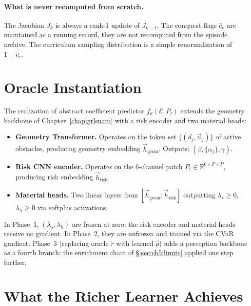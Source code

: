 \paragraph{What is never recomputed from scratch.}
The Jacobian $J_k$ is always a rank-1 update of $J_{k-1}$.
The conquest flags $\hat{c}_e$ are maintained as a running record, they are not recomputed from the episode archive.
The curriculum sampling distribution is a simple renormalization
of $1-\hat{c}_e$.

\section{Oracle Instantiation}
\label{sec:ch4:implementation}

The realization of abstract coefficient predictor $f_\theta(\mathcal{E},P_t)$ extends the
geometry backbone of Chapter~\ref{chap:grlsnam} with a risk encoder
and two material heads:

\begin{itemize}
  \item \textbf{Geometry Transformer.}
        Operates on the token set $\{(d_j,\vec{n}_j)\}$ of active
        obstacles, producing geometry embedding $\vec{h}_{\mathrm{geom}}$.
        Outputs: $(\beta,\{\alpha_j\},\gamma)$.
  \item \textbf{Risk CNN encoder.}
        Operates on the 6-channel patch $P_t\in\mathbb{R}^{6\times P\times P}$,
        producing risk embedding $\vec{h}_{\mathrm{risk}}$.
  \item \textbf{Material heads.}
        Two linear layers from
        $[\vec{h}_{\mathrm{geom}};\vec{h}_{\mathrm{risk}}]$
        outputting $\lambda_s\geq 0$, $\lambda_h\geq 0$
        via softplus activations.
\end{itemize}

In Phase~1, $(\lambda_s,\lambda_h)$ are frozen at zero; the risk
encoder and material heads receive no gradient.
In Phase~2, they are unfrozen and trained via the CVaR gradient.
Phase~3 (replacing oracle $\tilde{r}$ with learned $\hat\rho$)
adds a perception backbone as a fourth branch: the enrichment
chain of §\ref{sec:ch5:limits} applied one step further.

\section{What the Richer Learner Achieves}
\label{sec:ch4:results}

